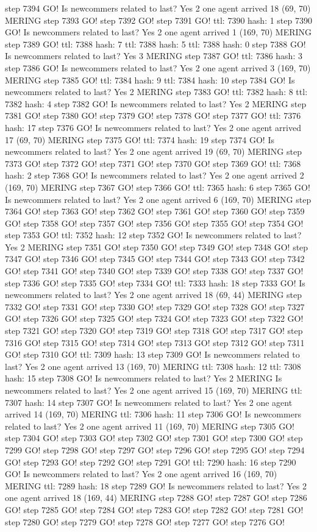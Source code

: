 step 7394 GO! Is newcommers related to last? Yes 2 one agent arrived 18 (69, 70) MERING step 7393 GO! step 7392 GO! step 7391 GO! ttl: 7390 hash: 1 step 7390 GO! Is newcommers related to last? Yes 2 one agent arrived 1 (169, 70) MERING step 7389 GO! ttl: 7388 hash: 7 ttl: 7388 hash: 5 ttl: 7388 hash: 0 step 7388 GO! Is newcommers related to last? Yes 3 MERING step 7387 GO! ttl: 7386 hash: 3 step 7386 GO! Is newcommers related to last? Yes 2 one agent arrived 3 (169, 70) MERING step 7385 GO! ttl: 7384 hash: 9 ttl: 7384 hash: 10 step 7384 GO! Is newcommers related to last? Yes 2 MERING step 7383 GO! ttl: 7382 hash: 8 ttl: 7382 hash: 4 step 7382 GO! Is newcommers related to last? Yes 2 MERING step 7381 GO! step 7380 GO! step 7379 GO! step 7378 GO! step 7377 GO! ttl: 7376 hash: 17 step 7376 GO! Is newcommers related to last? Yes 2 one agent arrived 17 (69, 70) MERING step 7375 GO! ttl: 7374 hash: 19 step 7374 GO! Is newcommers related to last? Yes 2 one agent arrived 19 (69, 70) MERING step 7373 GO! step 7372 GO! step 7371 GO! step 7370 GO! step 7369 GO! ttl: 7368 hash: 2 step 7368 GO! Is newcommers related to last? Yes 2 one agent arrived 2 (169, 70) MERING step 7367 GO! step 7366 GO! ttl: 7365 hash: 6 step 7365 GO! Is newcommers related to last? Yes 2 one agent arrived 6 (169, 70) MERING step 7364 GO! step 7363 GO! step 7362 GO! step 7361 GO! step 7360 GO! step 7359 GO! step 7358 GO! step 7357 GO! step 7356 GO! step 7355 GO! step 7354 GO! step 7353 GO! ttl: 7352 hash: 12 step 7352 GO! Is newcommers related to last? Yes 2 MERING step 7351 GO! step 7350 GO! step 7349 GO! step 7348 GO! step 7347 GO! step 7346 GO! step 7345 GO! step 7344 GO! step 7343 GO! step 7342 GO! step 7341 GO! step 7340 GO! step 7339 GO! step 7338 GO! step 7337 GO! step 7336 GO! step 7335 GO! step 7334 GO! ttl: 7333 hash: 18 step 7333 GO! Is newcommers related to last? Yes 2 one agent arrived 18 (69, 44) MERING step 7332 GO! step 7331 GO! step 7330 GO! step 7329 GO! step 7328 GO! step 7327 GO! step 7326 GO! step 7325 GO! step 7324 GO! step 7323 GO! step 7322 GO! step 7321 GO! step 7320 GO! step 7319 GO! step 7318 GO! step 7317 GO! step 7316 GO! step 7315 GO! step 7314 GO! step 7313 GO! step 7312 GO! step 7311 GO! step 7310 GO! ttl: 7309 hash: 13 step 7309 GO! Is newcommers related to last? Yes 2 one agent arrived 13 (169, 70) MERING ttl: 7308 hash: 12 ttl: 7308 hash: 15 step 7308 GO! Is newcommers related to last? Yes 2 MERING Is newcommers related to last? Yes 2 one agent arrived 15 (169, 70) MERING ttl: 7307 hash: 14 step 7307 GO! Is newcommers related to last? Yes 2 one agent arrived 14 (169, 70) MERING ttl: 7306 hash: 11 step 7306 GO! Is newcommers related to last? Yes 2 one agent arrived 11 (169, 70) MERING step 7305 GO! step 7304 GO! step 7303 GO! step 7302 GO! step 7301 GO! step 7300 GO! step 7299 GO! step 7298 GO! step 7297 GO! step 7296 GO! step 7295 GO! step 7294 GO! step 7293 GO! step 7292 GO! step 7291 GO! ttl: 7290 hash: 16 step 7290 GO! Is newcommers related to last? Yes 2 one agent arrived 16 (169, 70) MERING ttl: 7289 hash: 18 step 7289 GO! Is newcommers related to last? Yes 2 one agent arrived 18 (169, 44) MERING step 7288 GO! step 7287 GO! step 7286 GO! step 7285 GO! step 7284 GO! step 7283 GO! step 7282 GO! step 7281 GO! step 7280 GO! step 7279 GO! step 7278 GO! step 7277 GO! step 7276 GO! 